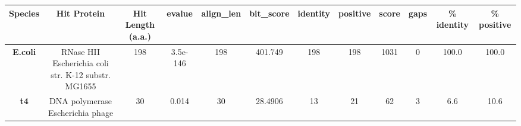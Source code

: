 \begin{tabular}{|c|c|c|c|c|c|c|c|c|c|c|c|} \hline
\textbf{Species} & \textbf{Hit Protein} & \textbf{Hit Length (a.a.)} & \textbf{evalue} & \textbf{align\_len} & \textbf{bit\_score} & \textbf{identity} & \textbf{positive} & \textbf{score} & \textbf{gaps} & \textbf{\% identity} & \textbf{\% positive} \\ \hline
\textbf{E.coli} & RNase HII Escherichia coli str. K-12 substr. MG1655 & 198 & 3.5e-146 & 198 & 401.749 & 198 & 198 & 1031 & 0 & 100.0 & 100.0\\
\textbf{t4} & DNA polymerase Escherichia phage  & 30 & 0.014 & 30 & 28.4906 & 13 & 21 & 62 & 3 & 6.6 & 10.6\\
\hline \end{tabular}
